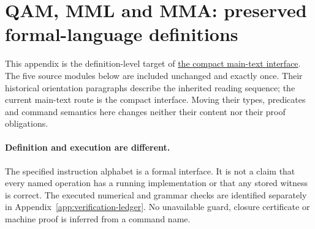 \clearpage
\section{QAM, MML and MMA: preserved formal-language definitions}
\label{app:qam-runtime-details}

This appendix is the definition-level target of
\hyperref[sec:compact-qam-interface]{the compact main-text interface}.
The five source modules below
are included unchanged and exactly once. Their historical orientation
paragraphs describe the inherited reading sequence; the current main-text
route is the compact interface. Moving their types, predicates and command
semantics here changes neither their content nor their proof obligations.

\paragraph{Definition and execution are different.}
The specified instruction alphabet is a formal interface. It is not a
claim that every named operation has a running implementation or that any
stored witness is correct. The executed numerical and grammar checks are
identified separately in Appendix~\ref{app:verification-ledger}.
No unavailable guard, closure certificate or machine proof is inferred
from a command name.






